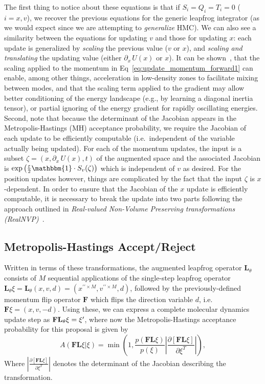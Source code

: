\documentclass[../main.tex]{subfiles}
\begin{document}
The first thing to notice about these equations is that if $S_{i} = Q_{i} =
T_{i} = 0$ ($i = x, v$), we recover the previous equations for the generic
leapfrog integrator (as we would expect since we are attempting to
\emph{generalize} HMC).
%
We can also see a similarity between the equations for updating $v$ and those
for updating $x$: each update is generalized by \emph{scaling} the previous
value ($v$ or $x$), and \emph{scaling and translating} the updating value
(either $\partial_{x}\,U(x)$ or $x$).
%
It can be shown~\cite{2017arXiv171109268L}, that the scaling applied to the
momentum in Eq~\ref{eq:update_momentum_forward1} can enable, among other
things, acceleration in low-density zones to facilitate mixing between modes,
and that the scaling term applied to the gradient may allow better conditioning
of the energy landscape (e.g., by learning a diagonal inertia tensor), or
partial ignoring of the energy gradient for rapidly oscillating energies.
%
Second, note that because the determinant of the Jacobian appears in the
Metropolis-Hastings (MH) acceptance probability, we require the Jacobian of
each update to be efficiently computable (i.e.\ independent of the variable
actually being updated).
%
For each of the momentum updates, the input is a subset $\zeta = (x,
\partial_{x}\,U(x), t)$ of the augmented space and the associated Jacobian is
$\exp{\left(\frac{\eps}{2}\mathbbm{1}\cdot S_{v}(\zeta)\right)}$ which is
independent of $v$ as desired.
%
For the position updates however, things are complicated by the fact that the
input $\zeta$ is $x$-dependent.
%
In order to ensure that the Jacobian of the $x$ update is efficiently
computable, it is necessary to break the update into two parts following the
approach outlined in \emph{Real-valued Non-Volume Preserving transformations
(RealNVP)}~\cite{dinhRealNVP}.
%
\subsection{Metropolis-Hastings Accept/Reject}
%
Written in terms of these transformations, the augmented leapfrog operator
$\mathbf{L}_{\theta}$ consists of $M$ sequential applications of the
single-step leapfrog operator $\mathbf{L}_{\theta} \xi = \mathbf{L}_{\theta}(x,
v, d) = (x^{\prime\prime\times M}, v^{\prime\prime\times M}, d)$, followed by
the previously-defined momentum flip operator $\mathbf{F}$ which flips the
direction variable $d$, i.e.\ $\mathbf{F}\xi = (x, v, -d)$.
%
Using these, we can express a complete molecular dynamics update step as
$\mathbf{FL}_{\theta}\xi = {\xi^{\prime}}$, where now the Metropolis-Hastings acceptance
probability for this proposal is given by
%
\begin{equation}
    A(\mathbf{F}\mathbf{L} \xi | \xi) = \min\left(1,
        \frac{p(\mathbf{F}\mathbf{L}\xi)}{p(\xi)}\left|
        \frac{\partial\left[\mathbf{F}\mathbf{L}\xi\right]}
            {\partial\xi^{T}}\right|\right),
\end{equation}
%
Where $\left|\frac{\partial\left[\mathbf{F}\mathbf{L}\xi\right]}
{\partial\xi^{T}}\right|$ denotes the determinant of the Jacobian describing
the transformation.
\end{document}

